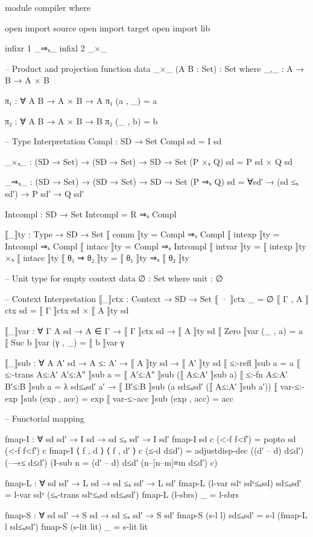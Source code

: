 \documentclass{article}
\begin{document}
\begin{prev}
\begin{code}
module compiler where

open import source
open import target
open import lib


infixr 1 _⇒ₛ_ 
infixl 2 _×_

-- Product and projection function
data _×_ (A B : Set) : Set where
    _,_ : A → B → A × B

π₁ : ∀ {A B} → A × B → A
π₁ (a , _) = a

π₂ : ∀ {A B} → A × B → B
π₂ (_ , b) = b

--  Type Interpretation
Compl : SD → Set
Compl sd = I sd

_×ₛ_ : (SD → Set) → (SD → Set) → SD → Set
(P ×ₛ Q) sd = P sd × Q sd

_⇒ₛ_ : (SD → Set) → (SD → Set) → SD → Set
(P ⇒ₛ Q) sd = ∀{sd′} → (sd ≤ₛ sd′) → P sd′ → Q sd′ 

Intcompl : SD → Set
Intcompl = R ⇒ₛ Compl


⟦_⟧ty : Type → SD → Set
⟦ comm ⟧ty = Compl ⇒ₛ Compl
⟦ intexp ⟧ty = Intcompl ⇒ₛ Compl
⟦ intacc ⟧ty = Compl ⇒ₛ Intcompl
⟦ intvar ⟧ty = ⟦ intexp ⟧ty ×ₛ ⟦ intacc ⟧ty
⟦ θ₁ ⇒ θ₂ ⟧ty = ⟦ θ₁ ⟧ty ⇒ₛ ⟦ θ₂ ⟧ty

-- Unit type for empty context
data ∅ : Set where
    unit : ∅

-- Context Interpretation
⟦_⟧ctx : Context → SD → Set
⟦ · ⟧ctx _ = ∅
⟦ Γ , A ⟧ctx sd = ⟦ Γ ⟧ctx sd × ⟦ A ⟧ty sd

⟦_⟧var : ∀ {Γ A sd} → A ∈ Γ → ⟦ Γ ⟧ctx sd → ⟦ A ⟧ty sd
⟦ Zero ⟧var (_ , a) = a
⟦ Suc b ⟧var (γ , _) =  ⟦ b ⟧var γ

⟦_⟧sub : ∀ {A A′ sd} → A ≤: A′ → ⟦ A ⟧ty sd → ⟦ A′ ⟧ty sd
⟦ ≤:-refl ⟧sub a = a
⟦ ≤:-trans A≤:A′ A′≤:A″ ⟧sub a = ⟦ A′≤:A″ ⟧sub (⟦ A≤:A′ ⟧sub a)
⟦ ≤:-fn A≤:A′ B′≤:B ⟧sub a = 
    λ sd≤ₛsd′ a′ → ⟦ B′≤:B ⟧sub (a sd≤ₛsd′ (⟦ A≤:A′ ⟧sub a′))
⟦ var-≤:-exp ⟧sub (exp , acc) = exp
⟦ var-≤:-acc ⟧sub (exp , acc) = acc


-- Functorial mapping

fmap-I : ∀ {sd sd′} → I sd → sd ≤ₛ sd′ → I sd′
fmap-I {sd} c (<-f f<f′) = popto sd (<-f f<f′) c
fmap-I {⟨ f , d ⟩} {⟨ f , d′ ⟩} c (≤-d d≤d′) = 
    adjustdisp-dec ((d′ – d) d≤d′) (–→≤ d≤d′) 
        (I-sub {n = (d′ – d) d≤d′} (n–[n–m]≡m d≤d′) c)

fmap-L : ∀ {sd sd′} → L sd → sd ≤ₛ sd′ → L sd′
fmap-L (l-var sdᵛ sdᵛ≤ₛsd) sd≤ₛsd′ = l-var sdᵛ (≤ₛ-trans sdᵛ≤ₛsd sd≤ₛsd′)
fmap-L (l-sbrs) _ = l-sbrs 

fmap-S : ∀ {sd sd′} → S sd → sd ≤ₛ sd′ → S sd′
fmap-S (s-l l) sd≤ₛsd′ = s-l (fmap-L l sd≤ₛsd′)
fmap-S (s-lit lit) _ = s-lit lit



\end{code}
\end{prev}
\end{document}
